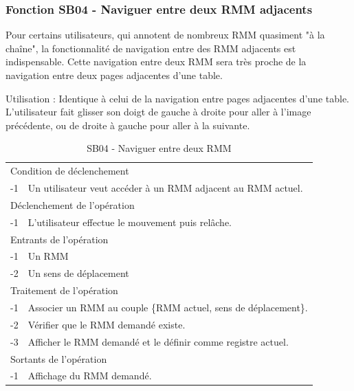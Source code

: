 \documentclass[a4paper]{article}
\begin{document}
\subsubsection{Fonction SB04 - Naviguer entre deux RMM adjacents}

Pour certains utilisateurs, qui annotent de nombreux RMM quasiment "à la chaîne", la fonctionnalité de navigation entre des RMM adjacents est indispensable. Cette navigation entre deux RMM sera très proche de la navigation entre deux pages adjacentes d'une table.

Utilisation : Identique à celui de la navigation entre pages adjacentes d'une table. L'utilisateur fait glisser son doigt de gauche \`a droite pour aller \`a l'image pr\'ec\'edente, ou de droite \`a gauche pour aller \`a la suivante.

\begin{table}[H]
  \centering
   \small
	\begin{tabular}{|c|p{12cm}|}
   		\hline
   			\rowcolor{lightgray}\multicolumn{2}{|c|}{\textbf{SB04 - Naviguer entre deux RMM adjacents}} \\
   		\hline
   			\multicolumn{2}{|l|}{Condition de d\'eclenchement} \\
   		\hline
   		-1 & Un utilisateur veut acc\'eder \`a un RMM adjacent au RMM actuel. \\
   		\hline
   			\multicolumn{2}{|l|}{D\'eclenchement de l'op\'eration} \\
   		\hline
   			-1 & L'utilisateur effectue le mouvement puis rel\^ache. \\
   		\hline
   			\multicolumn{2}{|l|}{Entrants de l'op\'eration} \\
   		\hline
   			-1 & Un RMM \\
        	-2 & Un sens de d\'eplacement \\ 
   		\hline
   			\multicolumn{2}{|l|}{Traitement de l'op\'eration} \\
  		\hline
   			-1 & Associer un RMM au couple \{RMM actuel, sens de d\'eplacement\}.  \\
        	-2 & V\'erifier que le RMM demand\'e existe. \\
        	-3 & Afficher le RMM demand\'e et le d\'efinir comme registre actuel. \\
   		\hline
   			\multicolumn{2}{|l|}{Sortants de l'op\'eration} \\
   		\hline
   			-1 & Affichage du RMM demand\'e. \\
   		\hline
	\end{tabular}
  \caption{SB04 - Naviguer entre deux RMM}
  \normalsize
  \label{tab:naviguer_deux_registres_adjacents}
\end{table}
\end{document}

